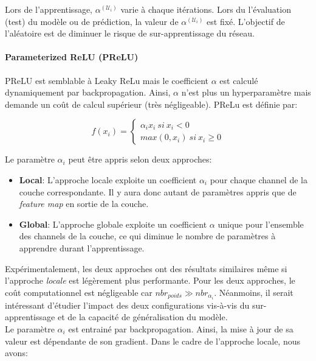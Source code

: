 \noindent Lors de l'apprentissage, $\alpha^{(\mathcal{U}_i)}$ varie à chaque itérations. Lors du l'évaluation (test) du modèle ou de prédiction, la valeur de $\alpha^{(\mathcal{U}_i)}$ est fixé. L'objectif de l'aléatoire est de diminuer le risque de sur-apprentissage du réseau.

\paragraph{Parameterized ReLU (PReLU)}
PReLU\cite{prelu_raw}\cite{randorelu} est semblable à Leaky ReLu mais le coefficient $\alpha$ est calculé dynamiquement par backpropagation. Ainsi, $\alpha$ n'est plus un hyperparamètre mais demande un coût de calcul supérieur (très négligeable). PReLu est définie par:

$$f(x_i)=\left\{\begin{array}{ll}\alpha_i x_i \ si \ x_i<0 \\max(0,x_i) \ si \ x_i\geq 0\end{array}\right.$$

\noindent Le paramètre $\alpha_i$ peut être appris selon deux approches:
\begin{itemize}
    \item \textbf{Local}: L'approche locale exploite un coefficient $\alpha_i$ pour chaque channel de la couche correspondante. Il y aura donc autant de paramètres appris que de \textit{feature map} en sortie de la couche.\\

    \item \textbf{Global}: L'approche globale exploite un coefficient $\alpha$ unique pour l'ensemble des channels de la couche, ce qui diminue le nombre de paramètres à apprendre durant l'apprentissage.
\end{itemize}

\noindent Expérimentalement, les deux approches ont des résultats similaires même si l'approche \textit{locale} est légèrement plus performante. Pour les deux approches, le coût computationnel est négligeable car $nbr_{poids} \gg nbr_{\alpha_i}$. Néanmoins, il serait intéressant d'étudier l'impact des deux configurations vis-à-vis du sur-apprentissage et de la capacité de généralisation du modèle.\\

\noindent Le paramètre $\alpha_i$ est entrainé par backpropagation. Ainsi, la mise à jour de sa valeur est dépendante de son gradient. Dans le cadre de l'approche locale, nous avons:

